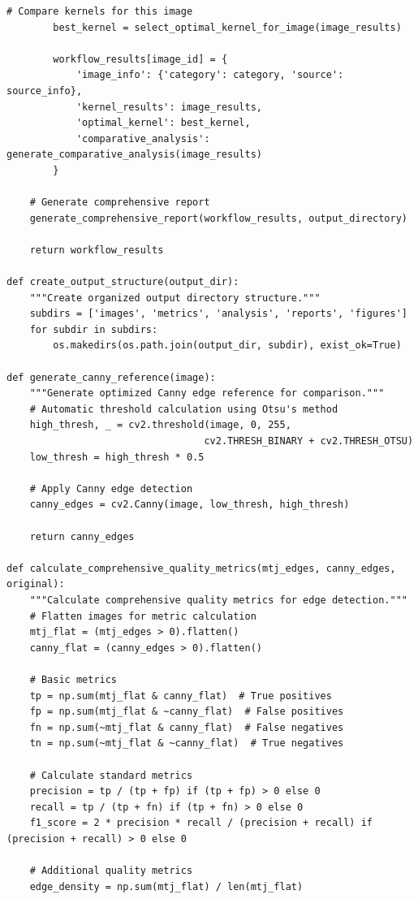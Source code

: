 \documentclass[conference]{IEEEtran}
\begin{document}
\begin{lstlisting}[caption={Complete workflow management system}]
        # Compare kernels for this image
        best_kernel = select_optimal_kernel_for_image(image_results)
        
        workflow_results[image_id] = {
            'image_info': {'category': category, 'source': source_info},
            'kernel_results': image_results,
            'optimal_kernel': best_kernel,
            'comparative_analysis': generate_comparative_analysis(image_results)
        }
    
    # Generate comprehensive report
    generate_comprehensive_report(workflow_results, output_directory)
    
    return workflow_results

def create_output_structure(output_dir):
    """Create organized output directory structure."""
    subdirs = ['images', 'metrics', 'analysis', 'reports', 'figures']
    for subdir in subdirs:
        os.makedirs(os.path.join(output_dir, subdir), exist_ok=True)

def generate_canny_reference(image):
    """Generate optimized Canny edge reference for comparison."""
    # Automatic threshold calculation using Otsu's method
    high_thresh, _ = cv2.threshold(image, 0, 255, 
                                  cv2.THRESH_BINARY + cv2.THRESH_OTSU)
    low_thresh = high_thresh * 0.5
    
    # Apply Canny edge detection
    canny_edges = cv2.Canny(image, low_thresh, high_thresh)
    
    return canny_edges

def calculate_comprehensive_quality_metrics(mtj_edges, canny_edges, original):
    """Calculate comprehensive quality metrics for edge detection."""
    # Flatten images for metric calculation
    mtj_flat = (mtj_edges > 0).flatten()
    canny_flat = (canny_edges > 0).flatten()
    
    # Basic metrics
    tp = np.sum(mtj_flat & canny_flat)  # True positives
    fp = np.sum(mtj_flat & ~canny_flat)  # False positives
    fn = np.sum(~mtj_flat & canny_flat)  # False negatives
    tn = np.sum(~mtj_flat & ~canny_flat)  # True negatives
    
    # Calculate standard metrics
    precision = tp / (tp + fp) if (tp + fp) > 0 else 0
    recall = tp / (tp + fn) if (tp + fn) > 0 else 0
    f1_score = 2 * precision * recall / (precision + recall) if (precision + recall) > 0 else 0
    
    # Additional quality metrics
    edge_density = np.sum(mtj_flat) / len(mtj_flat)
    

\end{lstlisting}
\end{document}
